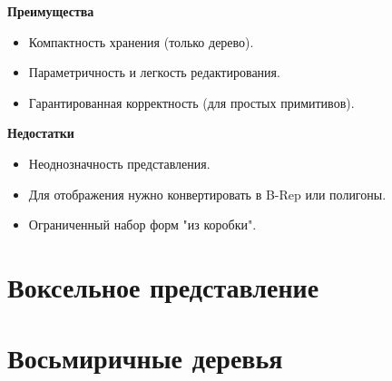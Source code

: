 \documentclass[10pt]{beamer}
\begin{document}
\begin{frame}
	
\centering
	
		{
			\textbf{Преимущества}
			
			\begin{itemize}
				\item Компактность хранения (только дерево). 
				\item Параметричность и легкость редактирования.
				\item Гарантированная корректность (для простых примитивов).
			\end{itemize}
		}
		{
			\textbf{Недостатки}
			
			\begin{itemize}
				\item Неоднозначность представления.
				\item Для отображения нужно конвертировать в B-Rep или полигоны.
				\item Ограниченный набор форм "из коробки".
			\end{itemize}
		}
	
	
	
\end{frame}

\section[Воксели]{Воксельное представление}


\begin{frame}
	
	{
	}
	{
	}
	
	
	\begingroup
	\renewcommand\thefootnote{}
	\endgroup
	
	
\end{frame}

\section[Octrees]{Восьмиричные деревья}


\begin{frame}
	
	
\end{frame}

\begin{frame}

	\centering{}
	
	
\end{frame}
\end{document}
